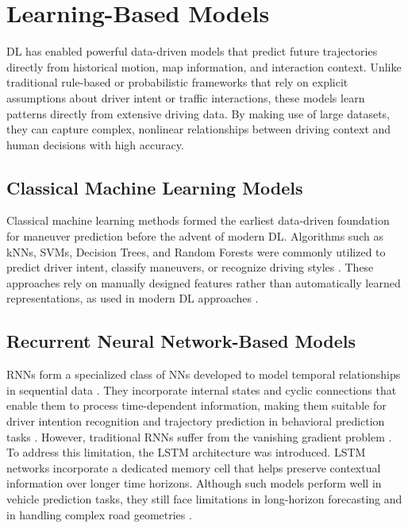 \section{Learning-Based Models}
\ac{DL} has enabled powerful data-driven models that predict future trajectories directly from
historical motion, map information, and interaction context. Unlike traditional rule-based or probabilistic
frameworks that rely on explicit assumptions about driver intent or traffic interactions, these models learn
patterns directly from extensive driving data. By making use of large datasets, they can capture complex,
nonlinear relationships between driving context and human decisions with high accuracy.

\subsection{Classical Machine Learning Models}
Classical machine learning methods formed the earliest data-driven foundation for maneuver prediction before the advent of modern \ac{DL}. Algorithms
such as \acp{kNN}, \acp{SVM}, Decision Trees, and
Random Forests were commonly utilized to predict driver intent, classify maneuvers, or recognize driving
styles \cite{app112210562}. These approaches rely on manually designed features rather than automatically learned representations,
as used in modern \ac{DL} approaches \cite{bengio2014representationlearningreviewnew}.

\subsection{Recurrent Neural Network-Based Models}
\acp{RNN} form a specialized class of \acp{NN} developed to model temporal relationships in
sequential data \cite{Goodfellow-et-al-2016}. They incorporate internal states and cyclic connections that enable them to process
time-dependent information, making them suitable for driver intention recognition and trajectory prediction 
in behavioral prediction tasks \cite{xin2019intentionawarelonghorizontrajectory,inproceedings}.
However, traditional \acp{RNN} suffer from the vanishing gradient problem \cite{10.1162/neco.1997.9.8.1735}. To address this limitation, the \ac{LSTM} architecture was
introduced. \ac{LSTM} networks incorporate a dedicated memory cell that helps preserve contextual information
over longer time horizons. Although such models perform well in vehicle prediction tasks, they still face limitations 
in long-horizon forecasting and in handling complex road geometries \cite{xin2019intentionawarelonghorizontrajectory,HUI2022126869}.

